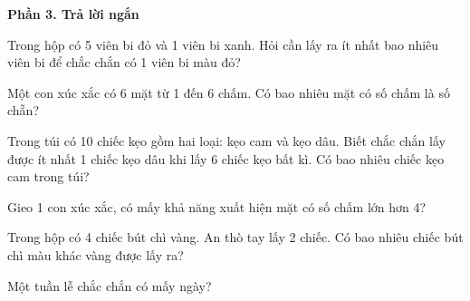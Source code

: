 \textbf{Phần 3. Trả lời ngắn}

\begin{ex} %
Trong hộp có 5 viên bi đỏ và 1 viên bi xanh. Hỏi cần lấy ra ít nhất bao nhiêu viên bi để chắc chắn có 1 viên bi màu đỏ?
\end{ex}

\begin{ex} %
Một con xúc xắc có 6 mặt từ 1 đến 6 chấm. Có bao nhiêu mặt có số chấm là số chẵn?
\end{ex}

\begin{ex} %
Trong túi có 10 chiếc kẹo gồm hai loại: kẹo cam và kẹo dâu. Biết chắc chắn lấy được ít nhất 1 chiếc kẹo dâu khi lấy 6 chiếc kẹo bất kì. Có bao nhiêu chiếc kẹo cam trong túi?
\end{ex}

\begin{ex} %
Gieo 1 con xúc xắc, có mấy khả năng xuất hiện mặt có số chấm lớn hơn 4?
\end{ex}

\begin{ex} %
Trong hộp có 4 chiếc bút chì vàng. An thò tay lấy 2 chiếc. Có bao nhiêu chiếc bút chì màu khác vàng được lấy ra?
\end{ex}

\begin{ex} %
Một tuần lễ chắc chắn có mấy ngày?
\end{ex}
